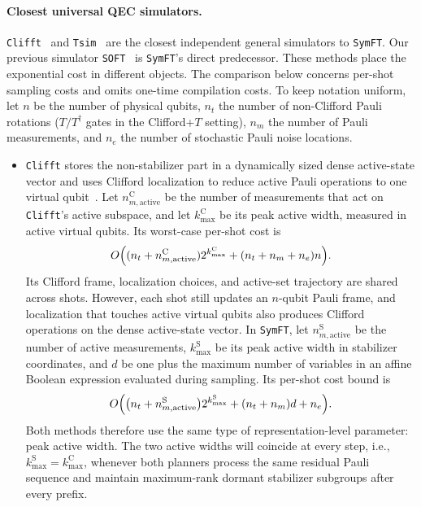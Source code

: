 \documentclass[a4paper,onecolumn,unpublished]{quantumarticle}
\DeclarePairedDelimiter\rbra{\lparen}{\rparen}
\newcommand{\tFont}[1]{\texttt{#1}}
\newcommand{\symft}{\tFont{SymFT}}
\newcommand{\soft}{\tFont{SOFT}}
\newcommand{\tsim}{\tFont{Tsim}}
\newcommand{\clifft}{\tFont{Clifft}}
\begin{document}
\paragraph{Closest universal QEC simulators.}
\clifft{}~\cite{CL26} and \tsim{}~\cite{HLZ26} are the closest independent general simulators to \symft{}.
Our previous simulator \soft{}~\cite{LZZ+25} is \symft{}'s direct predecessor.
These methods place the exponential cost in different objects.
The comparison below concerns per-shot sampling costs and omits one-time compilation costs.
To keep notation uniform, let $n$ be the number of physical qubits, $n_t$ the number of non-Clifford Pauli rotations ($T/T^\dagger$ gates in the Clifford+$T$ setting), $n_m$ the number of Pauli measurements, and $n_e$ the number of stochastic Pauli noise locations.
\begin{itemize}
    \item \clifft{} stores the non-stabilizer part in a dynamically sized dense active-state vector and uses Clifford localization to reduce active Pauli operations to one virtual qubit~\cite{CL26}.
    Let $n_{m,\mathrm{active}}^{\mathrm C}$ be the number of measurements that act on \clifft{}'s active subspace, and let $k_{\max}^{\mathrm C}$ be its peak active width, measured in active virtual qubits.
    Its worst-case per-shot cost is
    \begin{equation*}
        O\rbra*{(n_t+n_{m,\mathrm{active}}^{\mathrm C})
        2^{k_{\max}^{\mathrm C}} +(n_t+n_m+n_e)n}.
    \end{equation*}
    Its Clifford frame, localization choices, and active-set trajectory are shared across shots. However, each shot still updates an $n$-qubit Pauli frame, and localization that touches active virtual qubits also produces Clifford operations on the dense active-state vector.
    In \symft{}, let $n_{m,\mathrm{active}}^{\mathrm S}$ be the number of active measurements, $k_{\max}^{\mathrm S}$ be its peak active width in stabilizer coordinates, and $d$ be one plus the maximum number of variables in an affine Boolean expression evaluated during sampling.
    Its per-shot cost bound is
    \begin{equation*}
        O\rbra*{\rbra*{n_t+n_{m,\mathrm{active}}^{\mathrm S}} 2^{k_{\max}^{\mathrm S}} + \rbra*{n_t+n_m}d+n_e}.
    \end{equation*}
    Both methods therefore use the same type of representation-level parameter: peak active width.
    The two active widths will coincide at every step, i.e., $k_{\max}^{\mathrm S}=k_{\max}^{\mathrm C}$, whenever both planners process the same residual Pauli sequence and maintain maximum-rank dormant stabilizer subgroups after every prefix.

\end{itemize}
\end{document}
